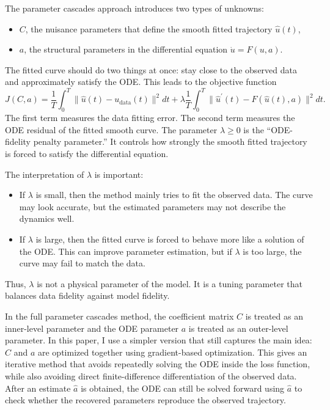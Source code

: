 \documentclass{article}
\begin{document}
The parameter cascades approach introduces two types of unknowns:
\begin{itemize}
    \item $C$, the nuisance parameters that define the smooth fitted trajectory $\hat u(t)$,
    \item $a$, the structural parameters in the differential equation $\dot u = F(u,a)$.
\end{itemize}
The fitted curve should do two things at once: stay close to the observed data and approximately satisfy the ODE. This leads to the objective function
\begin{equation}
    J(C,a)
    =
    \frac{1}{T}\int_0^T \|\hat u(t) - u_{\text{data}}(t) \|^2dt
    +
    \lambda \frac{1}{T} \int_0^T
    \| \hat u^\prime(t) - F(\hat u(t), a) \|^2 dt.
    \label{eq:cascade_parameter_objective}
\end{equation}
The first term measures the data fitting error. The second term measures the ODE residual of the fitted smooth curve. The parameter $\lambda \geq 0$ is the ``ODE-fidelity penalty parameter.'' It controls how strongly the smooth fitted trajectory is forced to satisfy the differential equation.

The interpretation of $\lambda$ is important:
\begin{itemize}
    \item If $\lambda$ is small, then the method mainly tries to fit the observed data. The curve may look accurate, but the estimated parameters may not describe the dynamics well.
    \item If $\lambda$ is large, then the fitted curve is forced to behave more like a solution of the ODE. This can improve parameter estimation, but if $\lambda$ is too large, the curve may fail to match the data.
\end{itemize}
Thus, $\lambda$ is not a physical parameter of the model. It is a tuning parameter that balances data fidelity against model fidelity.

In the full parameter cascades method, the coefficient matrix $C$ is treated as an inner-level parameter and the ODE parameter $a$ is treated as an outer-level parameter. In this paper, I use a simpler version that still captures the main idea: $C$ and $a$ are optimized together using gradient-based optimization. This gives an iterative method that avoids repeatedly solving the ODE inside the loss function, while also avoiding direct finite-difference differentiation of the observed data. After an estimate $\hat a$ is obtained, the ODE can still be solved forward using $\hat a$ to check whether the recovered parameters reproduce the observed trajectory.
\end{document}
